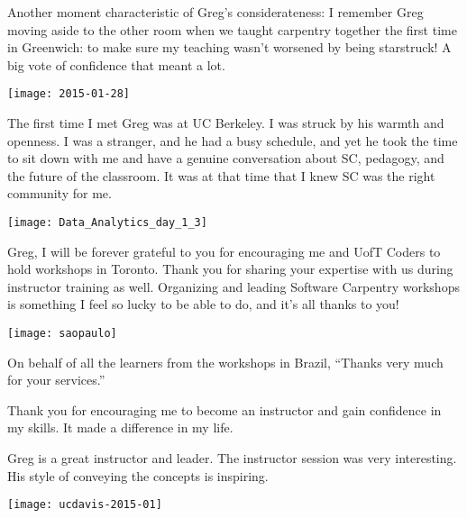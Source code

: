 Another moment characteristic of Greg's considerateness: I remember Greg moving
aside to the other room when we taught carpentry together the first time in
Greenwich: to make sure my teaching wasn't worsened by being starstruck! A big
vote of confidence that meant a lot.


\newpage

\texttt{[image: 2015-01-28]}

The first time I met Greg was at UC Berkeley. I was struck by his warmth and
openness. I was a stranger, and he had a busy schedule, and yet he took the
time to sit down with me and have a genuine conversation about SC, pedagogy,
and the future of the classroom. It was at that time that I knew SC was the
right community for me.


\newpage

\texttt{[image: Data\_Analytics\_day\_1\_3]}

Greg, I will be forever grateful to you for encouraging me and UofT Coders to
hold workshops in Toronto. Thank you for sharing your expertise with us during
instructor training as well. Organizing and leading Software Carpentry
workshops is something I feel so lucky to be able to do, and it's all thanks to
you!


\newpage

\texttt{[image: saopaulo]}

On behalf of all the learners from the workshops in Brazil, ``Thanks very much
for your services.''



Thank you for encouraging me to become an instructor and gain confidence in my
skills. It made a difference in my life.



Greg is a great instructor and leader. The instructor session was very
interesting. His style of conveying the concepts is inspiring.


\newpage

\texttt{[image: ucdavis-2015-01]}

